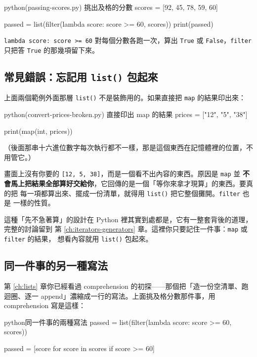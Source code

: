 \begin{example}{python}{(passing-scores.py) 挑出及格的分數}
scores = [92, 45, 78, 59, 60]

passed = list(filter(lambda score: score >= 60, scores))
print(passed)
\end{example}

\iosample{}{[92, 78, 60] \\}

\texttt{lambda score: score >= 60} 對每個分數各跑一次，算出 \texttt{True} 或
\texttt{False}，\texttt{filter} 只把答 \texttt{True} 的那幾項留下來。

\subsection*{常見錯誤：忘記用 \texttt{list()} 包起來}

上面兩個範例外面那層 \texttt{list()} 不是裝飾用的。如果直接把 \texttt{map} 的結果印出來：

\begin{example}{python}{(convert-prices-broken.py) 直接印出 map 的結果}
prices = ["12", "5", "38"]

print(map(int, prices))
\end{example}


（後面那串十六進位數字每次執行都不一樣，那是這個東西在記憶體裡的位置，不用管它。）

畫面上沒有你要的 \texttt{[12, 5, 38]}，而是一個看不出內容的東西。原因是 \texttt{map} 並
\textbf{不會馬上把結果全部算好交給你}，它回傳的是一個「等你來拿才現算」的東西。要真的把
每一項都算出來、擺成一份清單，就得用 \texttt{list()} 把它整個攤開。\texttt{filter} 也是
一樣的性質。

這種「先不急著算」的設計在 Python 裡其實到處都是，它有一整套背後的道理，完整的討論留到
第 \ref{ch:iterators-generators} 章。這裡你只要記住一件事：\texttt{map} 或 \texttt{filter} 的結果，
想看內容就用 \texttt{list()} 包起來。

\subsection*{同一件事的另一種寫法}

第 \ref{ch:lists} 章你已經看過 comprehension 的初探——那個把「造一份空清單、跑迴圈、逐一
append」濃縮成一行的寫法。上面挑及格分數那件事，用 comprehension 寫是這樣：

\begin{code}{python}{同一件事的兩種寫法}
passed = list(filter(lambda score: score >= 60, scores))

passed = [score for score in scores if score >= 60]
\end{code}

